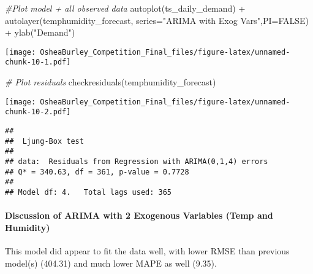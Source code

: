\documentclass[
]{article}
\newenvironment{Shaded}{\begin{snugshade}}{\end{snugshade}}
\newcommand{\AttributeTok}[1]{\textcolor[rgb]{0.77,0.63,0.00}{#1}}
\newcommand{\CommentTok}[1]{\textcolor[rgb]{0.56,0.35,0.01}{\textit{#1}}}
\newcommand{\ConstantTok}[1]{\textcolor[rgb]{0.00,0.00,0.00}{#1}}
\newcommand{\FunctionTok}[1]{\textcolor[rgb]{0.00,0.00,0.00}{#1}}
\newcommand{\NormalTok}[1]{#1}
\newcommand{\OtherTok}[1]{\textcolor[rgb]{0.56,0.35,0.01}{#1}}
\newcommand{\SpecialCharTok}[1]{\textcolor[rgb]{0.00,0.00,0.00}{#1}}
\newcommand{\StringTok}[1]{\textcolor[rgb]{0.31,0.60,0.02}{#1}}
\begin{document}
\begin{Shaded}
\begin{Highlighting}[]
\CommentTok{\#Plot model + all observed data}
\FunctionTok{autoplot}\NormalTok{(ts\_daily\_demand) }\SpecialCharTok{+}
  \FunctionTok{autolayer}\NormalTok{(temphumidity\_forecast, }\AttributeTok{series=}\StringTok{"ARIMA with Exog Vars"}\NormalTok{,}\AttributeTok{PI=}\ConstantTok{FALSE}\NormalTok{) }\SpecialCharTok{+}
  \FunctionTok{ylab}\NormalTok{(}\StringTok{"Demand"}\NormalTok{)}
\end{Highlighting}
\end{Shaded}

\texttt{[image: OsheaBurley\_Competition\_Final\_files/figure-latex/unnamed-chunk-10-1.pdf]}

\begin{Shaded}
\begin{Highlighting}[]
\CommentTok{\# Plot residuals}
\FunctionTok{checkresiduals}\NormalTok{(temphumidity\_forecast)}
\end{Highlighting}
\end{Shaded}

\texttt{[image: OsheaBurley\_Competition\_Final\_files/figure-latex/unnamed-chunk-10-2.pdf]}

\begin{verbatim}
## 
##  Ljung-Box test
## 
## data:  Residuals from Regression with ARIMA(0,1,4) errors
## Q* = 340.63, df = 361, p-value = 0.7728
## 
## Model df: 4.   Total lags used: 365
\end{verbatim}

\begin{Shaded}
\end{Shaded}

\hypertarget{discussion-of-arima-with-2-exogenous-variables-temp-and-humidity}{%
\paragraph{Discussion of ARIMA with 2 Exogenous Variables (Temp and
Humidity)}\label{discussion-of-arima-with-2-exogenous-variables-temp-and-humidity}}

This model did appear to fit the data well, with lower RMSE than
previous model(s) (404.31) and much lower MAPE as well (9.35).
\end{document}
